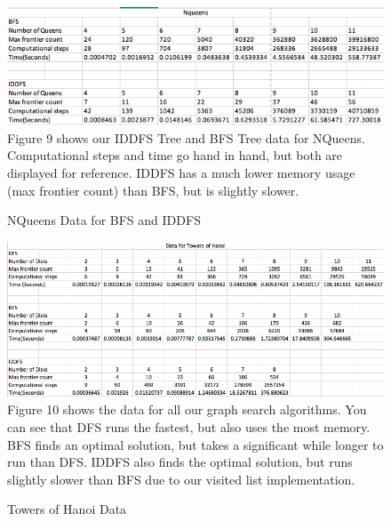 \documentclass{article}
\begin{document}
\begin{figure}[!htb]
\caption{NQueens Data for BFS and IDDFS}
\includegraphics[width=\textwidth]{QueensComp.png}
Figure 9 shows our IDDFS Tree and BFS Tree data for NQueens. Computational steps and time go hand in hand, but both are displayed for reference. IDDFS has a much lower memory usage (max frontier count) than BFS, but is slightly slower.
\end{figure}

\begin{figure}[!htb]
\caption{Towers of Hanoi Data}
\includegraphics[width=\textwidth]{TowerTable.png}
Figure 10 shows the data for all our graph search algorithms. You can see that DFS runs the fastest, but also uses the most memory. BFS finds an optimal solution, but takes a significant while longer to run than DFS. IDDFS also finds the optimal solution, but runs slightly slower than BFS due to our visited list implementation.
\end{figure}
\end{document}
